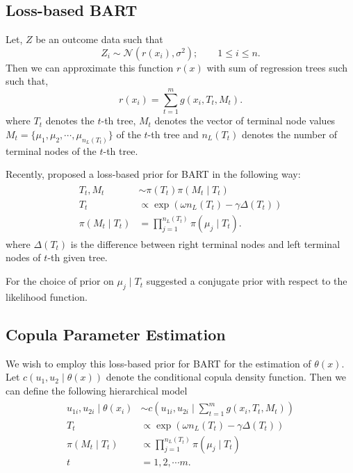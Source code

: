 \documentclass{amsart}
\begin{document}
\subsection{Loss-based BART}

Let, $Z$ be an outcome data such that 
\begin{equation*}
	Z_i \sim \mathcal{N}\left(r(x_i),\sigma^2\right);\qquad 1\le i\le n.
\end{equation*}
Then we can approximate this function $r(x)$ with sum of regression trees such such that,
\begin{equation*}
	r(x_i) = \sum_{t=1}^m g(x_i, T_t, M_t).
\end{equation*}
where $T_t$ denotes the $t$-th tree, $M_t$ denotes the vector of terminal node values $M_t = \{\mu_1,\mu_2, \cdots, \mu_{n_L(T_t)}\}$ of the $t$-th tree and $n_L(T_t)$ denotes the number of terminal nodes of the $t$-th tree. 

Recently, \citet{serafini2024lossbasedpriortreetopologies} proposed a loss-based prior for BART in the following way:
\begin{align}
	\begin{split}
	    T_t, M_t &\sim \pi(T_t)\pi(M_t\mid T_t)\\
	T_t &\propto \exp\left(\omega n_L(T_t)-\gamma\Delta(T_t)\right)\\
	\pi(M_t\mid T_t) & = \prod_{j=1}^{n_L(T_t)}\pi(\mu_j\mid T_t).
	\end{split}
\end{align}
where $\Delta(T_t)$ is the difference between right terminal nodes and left terminal nodes of $t$-th given tree.

For the choice of prior on $\mu_j\mid T_t$ \citet{chipman_BART,serafini2024lossbasedpriortreetopologies} suggested a conjugate prior with respect to the likelihood function. 

\subsection{Copula Parameter Estimation}

We wish to employ this loss-based prior for BART for the estimation of $\theta(x)$. Let $c(u_1,u_2\mid \theta(x))$ denote the conditional copula density function. Then we can define the following hierarchical model
\begin{align}
	\begin{split}
	    u_{1i},u_{2i} \mid \theta(x_i) & \sim c(u_{1i},u_{2i}\mid \sum_{t=1}^m g(x_i, T_t, M_t))\\
	T_t &\propto \exp\left(\omega n_L(T_t)-\gamma\Delta(T_t)\right)\\
	\pi(M_t\mid T_t) &\propto \prod_{j=1}^{n_L(T_t)}\pi(\mu_j\mid T_t)\\
	t & = 1,2,\cdots m.
	\end{split}
\end{align}
\end{document}
